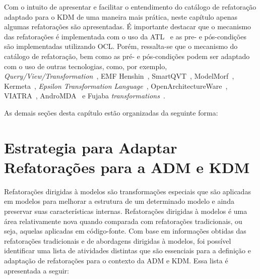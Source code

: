 Com o intuito de apresentar e facilitar o entendimento do catálogo de refatoração adaptado para o KDM de uma maneira mais prática, neste capítulo apenas algumas refatorações são apresentadas. É importante destacar que o mecanismo das refatorações é implementada com o uso da ATL~\cite{Allilaire_06, Jouault_2005, Jouault_2008} e as pre- e pós-condições são implementadas utilizando OCL. Porém, ressalta-se que o mecanismo do catálogo de refatoração, bem como as pré- e pós-condições podem ser adaptado com o uso de outras tecnologias, como, por exemplo, \textit{Query/View/Transformation}~\cite{QVT:OMG}, EMF Henshin~\cite{EMF_Henshin}, SmartQVT~\cite{SmartQVT}, ModelMorf~\cite{ModelMorf}, Kermeta~\cite{kermeta}, \textit{Epsilon Transformation Language}~\cite{ETL_eclipse}, OpenArchitectureWare~\cite{OpenArchitectureWare}, VIATRA~\cite{viatra}, AndroMDA~\cite{andromda} e Fujaba \textit{transformations}~\cite{fujaba}.

As demais seções desta capítulo estão organizadas da seguinte forma:

\section{Estrategia para Adaptar Refatorações para a ADM e KDM}

Refatorações dirigidas à modelos são transformações especiais que são aplicadas em modelos para melhorar a estrutura de um determinado modelo e ainda preservar suas características internas. Refatorações dirigidas à modelos é uma área relativamente nova quando comparada com refatorações tradicionais, ou seja, aquelas aplicadas em código-fonte. Com base em informações obtidas das refatorações tradicionais e de abordagens dirigidas à modelos, foi possível identificar uma lista de atividades distintas que são essenciais para a definição e adaptação de refatorações para o contexto da ADM e KDM. Essa lista é apresentada a seguir:

